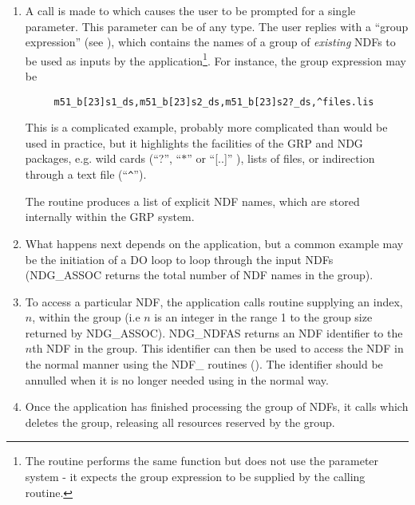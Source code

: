 \begin{enumerate}

\item A call is made to  which causes the user 
to be prompted for a single parameter. This parameter can be of any type.
The user replies with a ``group expression'' (see
), which contains the names of a group of {\em
existing} NDFs to be used as inputs by the application\footnote{The routine
 performs the same function but does not
use the parameter system - it expects the group expression to be supplied by 
the calling routine.}. For instance, the group expression may be

\begin{verbatim}
     m51_b[23]s1_ds,m51_b[23]s2_ds,m51_b[23]s2?_ds,^files.lis
\end{verbatim}

This is a complicated example, probably more complicated than would be
used in practice, but it highlights the facilities of the GRP and NDG
packages, e.g. wild cards (``?'', ``$*$'' or ``[..]'' ), lists of files,
or indirection through a text file (``\verb+^+'').

The  routine produces a list of explicit NDF names, which are stored
internally within the GRP system. 

\item What happens next depends on the application, but a common example may be
the initiation of a DO loop to loop through the input NDFs (NDG\_ASSOC returns
the total number of NDF names in the group). 

\item To access a particular NDF, the application calls routine 
supplying an index, $n$, within the group (i.e $n$ is an integer in the range 1
to the group size returned by NDG\_ASSOC). NDG\_NDFAS returns an NDF identifier
to the $n$th NDF in the group. This identifier can then be used to access the
NDF in the normal manner using the NDF\_ routines (). The identifier
should be annulled when it is no longer needed using  in the
normal way.

\item Once the application has finished processing the group of NDFs, it calls 
 which deletes the group, releasing all resources reserved by the group.


\end{enumerate}
